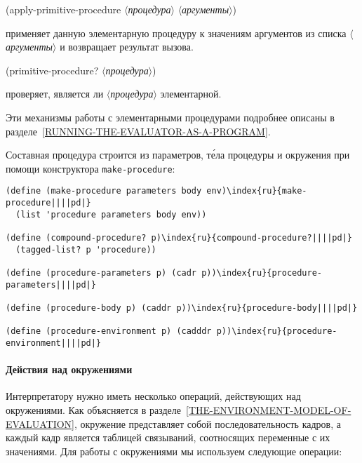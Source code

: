 \begin{plainlist}
\item
{\small (apply-primitive-procedure \textit{$\langle$процедура$\rangle$} \textit{$\langle$аргументы$\rangle$})}

применяет данную элементарную 
процедуру к значениям аргументов из
списка \textit{$\langle$аргументы$\rangle$} и возвращает результат вызова.

\item
{\small (primitive-procedure? \textit{$\langle$процедура$\rangle$})  }

проверяет, является ли \textit{$\langle$процедура$\rangle$} элементарной.
\end{plainlist}
Эти механизмы работы с элементарными процедурами подробнее описаны в
разделе~\ref{RUNNING-THE-EVALUATOR-AS-A-PROGRAM}.

Составная процедура строится из параметров, т\'{е}ла процедуры
и окружения при помощи конструктора {\tt make-procedure}:

\begin{Verbatim}[fontsize=\small]
(define (make-procedure parameters body env)\index{ru}{make-procedure||||pd|}
  (list 'procedure parameters body env))

(define (compound-procedure? p)\index{ru}{compound-procedure?||||pd|}
  (tagged-list? p 'procedure))

(define (procedure-parameters p) (cadr p))\index{ru}{procedure-parameters||||pd|}

(define (procedure-body p) (caddr p))\index{ru}{procedure-body||||pd|}

(define (procedure-environment p) (cadddr p))\index{ru}{procedure-environment||||pd|}
\end{Verbatim}

\paragraph{Действия над окружениями}

Интерпретатору нужно иметь несколько операций,
действующих над окружениями.  Как объясняется в 
разделе~\ref{THE-ENVIRONMENT-MODEL-OF-EVALUATION}, окружение
представляет собой последовательность кадров, а каждый кадр является
таблицей связываний, соотносящих переменные с их значениями.  Для
работы с окружениями мы используем следующие операции:

